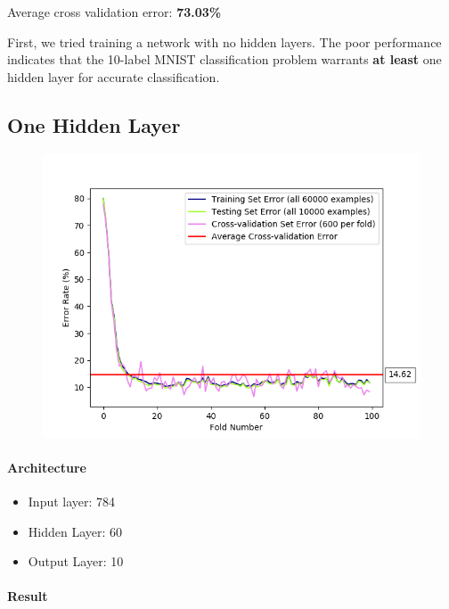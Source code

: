 \documentclass[11pt]{article}
\makeatletter
\def\maxwidth{\ifdim\Gin@nat@width>\linewidth\linewidth
    \else\Gin@nat@width\fi}
\let\Oldincludegraphics\includegraphics
\renewcommand{\includegraphics}[1]{\Oldincludegraphics[width=.8\maxwidth]{#1}}
\providecommand{\tightlist}{%
      \setlength{\itemsep}{0pt}\setlength{\parskip}{0pt}}
\makeatother
\begin{document}
Average cross validation error: \textbf{73.03\%}

First, we tried training a network with no hidden layers. The poor
performance indicates that the 10-label MNIST classification problem warrants \textbf{at least} 
one hidden layer for accurate classification.

\pagebreak

\subsection{One Hidden Layer}\label{one-hidden-layer}

\begin{figure}[htbp]
\centering
\includegraphics{plots/ff-numlayers-60.png}
\end{figure}

\paragraph{Architecture}\label{architecture-1}

\begin{itemize}
\tightlist
\item
  Input layer: 784
\item
  Hidden Layer: 60
\item
  Output Layer: 10
\end{itemize}

\paragraph{Result}\label{result}
\end{document}
